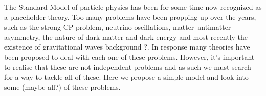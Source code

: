 \documentclass[12pt]{article}
\begin{document}
\TitlePage
  \vspace*{55mm}
       {
       The Standard Model of particle physics has been for some time now recognized as a placeholder theory. Too many problems have been propping up over the years, such as the strong CP problem, neutrino oscillations, matter–antimatter asymmetry, the nature of dark matter and dark energy and most recently the {\color{blue} existence of gravitational waves background ?}. In response many theories have been proposed to deal with each one of these problems. However, it's important to realise that these are not independent problems and as such we must search for a way to tackle all of these. Here we propose a simple model and look into some (maybe all?) of these problems. 
       }
\EndTitlePage
\titlepage\ \endtitlepage %


\tableofcontents

\cleardoublepage
\listoffigures

\cleardoublepage
\listoftables

\cleardoublepage

\setcounter{page}{1}














\end{document}
